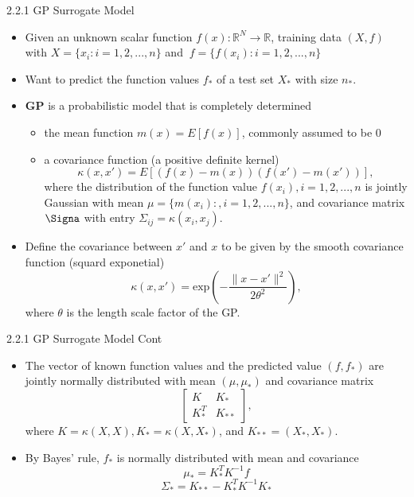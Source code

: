 \documentclass{beamer}
\begin{document}
\begin{frame}{2.2.1 GP Surrogate Model}

\begin{itemize}
    \item Given an unknown scalar function $f(x):\mathbb{R}^N \rightarrow \mathbb{R}$, training data $(X,f)$ with $X=\{x_i:i=1,2,...,n\}$ and $\ f = \{f(x_i):i=1,2,...,n \}$
    \item Want to predict the function values $f_*$ of a test set $X_*$ with size $n_*$. 
    \item \textbf{GP} is a probabilistic model that is completely determined
    \begin{itemize}
        \item the mean function $m(x)=E[f(x)]$, commonly assumed to be 0
        \item a covariance function (a positive definite kernel) 
        $$\kappa(x, x') = E[(f(x)-m(x))(f(x')-m(x '))],$$
        where the distribution of the function value $f(x_i),i=1,2,...,n$ is jointly Gaussian with mean $\mu = \{m(x_i):,i=1,2,...,n\}$, and covariance matrix $\Signa$ with entry $\Sigma_{ij} = \kappa (x_i,x_j)$.
        
    \end{itemize}
    \item Define the covariance between $x '$ and $x$ to be given by the smooth covariance function (squard exponetial)
    $$\kappa(x, x ') = \text{exp} \left( - \frac{\|x - x' \|^2}{2 \theta^2} \right),$$
    where $\theta$ is the length scale factor of the GP.
    
\end{itemize}
\end{frame}

\begin{frame}{2.2.1 GP Surrogate Model Cont}

\begin{itemize}
    \item The vector of known function values and the predicted value $(f,f_*)$ are jointly normally distributed with mean $(\mu,\mu_*)$ and covariance matrix
        $$\begin{bmatrix} K & K_*\\ K_*^T&K_{**} \end{bmatrix},$$
    where $K = \kappa(X,X),K_* = \kappa (X,X_*)$, and $K_{**} = (X_*,X_*)$. 
    \item By Bayes' rule, $f_*$ is normally distributed with mean and covariance 
       $$ \mu_* = K_*^T K^{-1}f \nonumber $$
        $$\Sigma_* = K_{**}- K_*^TK^{-1}K_* $$
    


\end{itemize}
\end{frame}
\end{document}
